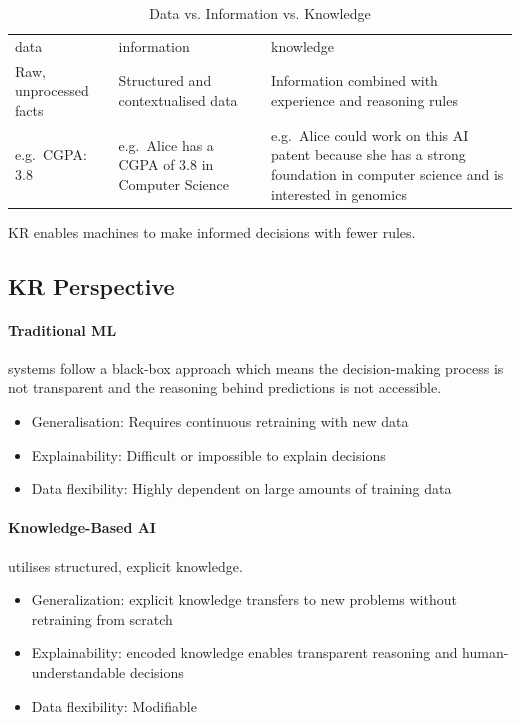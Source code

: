 \begin{table}[H]
    \begin{tabular}{p{5cm}p{5cm}p{5cm}}
        \Gls{data}      & \Gls{information}                                 & \Gls{knowledge}                   \\
        Raw, unprocessed facts & Structured and contextualised data & Information combined with experience and
        reasoning rules \\
        e.g.\ CGPA: 3.8 & e.g.\ Alice has a CGPA of 3.8 in Computer Science & e.g.\ Alice could work on this AI
        patent because she has a strong foundation in computer science and is interested in genomics
    \end{tabular}
    \caption{Data vs. Information vs. Knowledge }\label{tab:data-information-knowledge}
\end{table}

KR enables machines to make informed decisions with fewer rules.

\subsection*{KR Perspective}

\paragraph{Traditional ML} systems follow a black-box approach which means the decision-making process is not transparent and the reasoning behind predictions is not accessible.

\begin{itemize}
    \item Generalisation: Requires continuous retraining with new data
    \item Explainability: Difficult or impossible to explain decisions
    \item Data flexibility: Highly dependent on large amounts of training data
\end{itemize}

\paragraph{Knowledge-Based AI} utilises structured, \gls{explicit knowledge}.


\begin{itemize}
    \item Generalization: explicit knowledge transfers to new problems without retraining
    from scratch\cite{hogan2021}
    \item Explainability: encoded knowledge enables transparent reasoning and human-understandable decisions\cite{cao2024}
    \item Data flexibility: Modifiable
\end{itemize}

